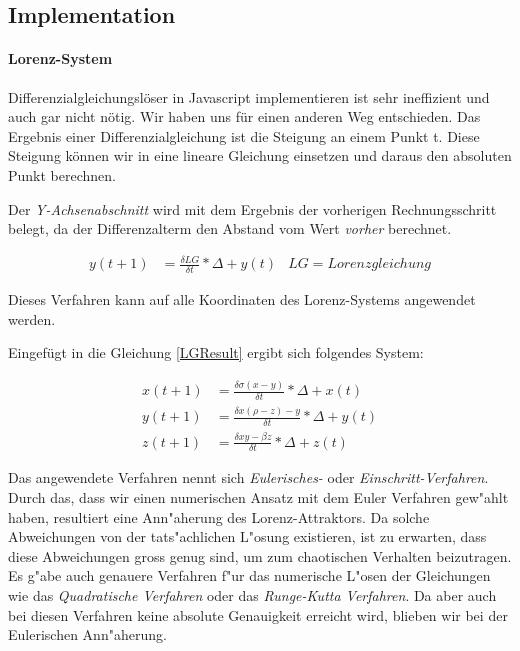 \documentclass[implementation]{subfiles}
\begin{document}
\subsection{Implementation}

\paragraph{Lorenz-System}
Differenzialgleichungslöser in Javascript implementieren ist sehr ineffizient und auch gar nicht nötig. Wir haben uns für einen anderen Weg entschieden. Das Ergebnis einer Differenzialgleichung ist die Steigung an einem Punkt t. Diese Steigung können wir in eine lineare Gleichung einsetzen und daraus den absoluten Punkt berechnen.

Der \textit{Y-Achsenabschnitt} wird mit dem Ergebnis der vorherigen Rechnungsschritt belegt, da der Differenzalterm den Abstand vom Wert \textit{vorher} berechnet.  

\begin{align}
\label{LGResult}
y(t + 1) &= \frac{\delta LG}{\delta t} * \Delta + y(t) & LG = Lorenzgleichung
\end{align}

Dieses Verfahren kann auf alle Koordinaten des Lorenz-Systems angewendet werden.

Eingefügt in die Gleichung \eqref{LGResult} ergibt sich folgendes System:

\begin{centerFigure}
	\begin{align}
	x(t + 1) &= \frac{\delta \sigma(x - y)}{\delta t} * \Delta + x(t)\\
	y(t + 1) &= \frac{\delta x(\rho - z) - y}{\delta t} * \Delta + y(t)\\
	z(t + 1) &= \frac{\delta xy - \beta z}{\delta t} * \Delta + z(t)
	\end{align}
\end{centerFigure}
Das angewendete Verfahren nennt sich \textit{Eulerisches-} oder \textit{Einschritt-Verfahren}. Durch das, dass wir einen numerischen Ansatz mit dem Euler Verfahren gew"ahlt haben, resultiert eine Ann"aherung des Lorenz-Attraktors. Da solche Abweichungen von der tats"achlichen L"osung existieren, ist zu erwarten, dass diese Abweichungen gross genug sind, um zum chaotischen Verhalten beizutragen. Es g"abe auch genauere Verfahren f"ur das numerische L"osen der Gleichungen wie das \textit{Quadratische Verfahren} oder das \textit{Runge-Kutta Verfahren}. Da aber auch bei diesen Verfahren keine absolute Genauigkeit erreicht wird, blieben wir bei der Eulerischen Ann"aherung. \\
\end{document}

